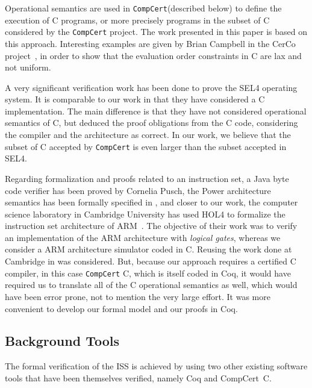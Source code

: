 \documentclass{llncs}
\newcommand{\compcert}{\texttt{CompCert}\xspace}
\begin{document}
Operational semantics are used in \compcert (described below) to
define the execution of C programs, or more precisely programs in the
subset of C considered by the \compcert project.  The work presented
in this paper is based on this approach.  Interesting examples are
given by Brian Campbell in the CerCo
project~\cite{campbell2012executable}, in order to show that the
evaluation order constraints in C are lax and not uniform.

A very significant verification work has been done to prove the SEL4
operating system\cite{sel4-sosp2009}. It is comparable to our work in
that they have considered a C implementation.  The main difference is
that they have not considered operational semantics of C, but deduced
the proof obligations from the C code, considering the compiler and
the architecture as correct. In our work, we believe that the subset
of C accepted by \compcert is even larger than the subset accepted in
SEL4.

Regarding formalization and proofs related to an instruction set, a
Java byte code verifier has been proved by Cornelia
Pusch\cite{pusch-1999}, the Power architecture semantics has been
formally specified in \cite{alglave-2009}, and closer to our work, the
computer science laboratory in Cambridge University has used HOL4 to
formalize the instruction set architecture of ARM~\cite{FoxM10}. The
objective of their work was to verify an implementation of the ARM
architecture with \emph{logical gates}, whereas we consider a ARM
architecture simulator coded in C.  Reusing the work done at Cambridge
in \cite{FoxM10} was considered.  But, because our approach requires a
certified C compiler, in this case \compcert C, which is itself coded
in Coq, it would have required us to translate all of the C
operational semantics as well, which would have been error prone, not
to mention the very large effort. It was more convenient to develop
our formal model and our proofs in Coq.

\subsection{Background Tools} %
\label{tools}

The formal verification of the ISS is achieved by using two other
existing software tools that have been themselves verified, namely Coq
and CompCert~C.
\end{document}
